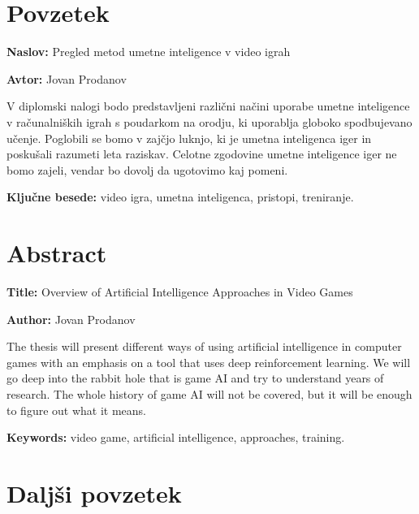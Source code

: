\documentclass[a4paper, 12pt]{book}
\newcommand{\ttitle}{Pregled metod umetne inteligence v video igrah}
\newcommand{\ttitleEn}{Overview of Artificial Intelligence Approaches in Video Games}
\newcommand{\tauthor}{Jovan Prodanov}
\newcommand{\tkeywords}{video igra, umetna inteligenca, pristopi, treniranje}
\newcommand{\tkeywordsEn}{video game, artificial intelligence, approaches, training}
\newcommand{\clearemptydoublepage}{\newpage{\pagestyle{empty}\cleardoublepage}}
\begin{document}
\clearemptydoublepage


\chapter*{Povzetek}

\noindent\textbf{Naslov:} \ttitle
\bigskip

\noindent\textbf{Avtor:} \tauthor
\bigskip

\noindent 
V diplomski nalogi bodo predstavljeni različni načini uporabe umetne inteligence v računalniških igrah s poudarkom na orodju, ki uporablja globoko spodbujevano učenje. Poglobili se bomo v zajčjo luknjo, ki je umetna inteligenca iger in poskušali razumeti leta raziskav. Celotne zgodovine umetne inteligence iger ne bomo zajeli, vendar bo dovolj da ugotovimo kaj pomeni.
\bigskip

\noindent\textbf{Ključne besede:} \tkeywords.
\clearemptydoublepage



\chapter*{Abstract}

\noindent\textbf{Title:} \ttitleEn
\bigskip

\noindent\textbf{Author:} \tauthor
\bigskip

\noindent 
The thesis will present different ways of using artificial intelligence in computer games with an emphasis on a tool that uses deep reinforcement learning.
We will go deep into the rabbit hole that is game AI and try to understand years of research. The whole history of game AI will not be covered, but it will be enough to figure out what it means.
\bigskip



\noindent\textbf{Keywords:} \tkeywordsEn.
\clearemptydoublepage



\chapter*{Daljši povzetek}
\end{document}
